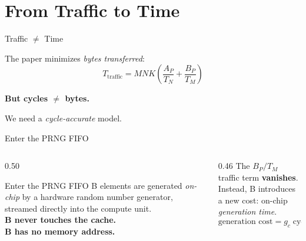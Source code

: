 \documentclass[aspectratio=169]{beamer}
\begin{document}
\section{From Traffic to Time}

\begin{frame}{Traffic $\neq$ Time}


\begin{center}
  The paper minimizes \emph{bytes transferred}:\\
  \medskip
  \[
    T_{\text{traffic}} = MNK\!\left(\frac{A_P}{T_N} + \frac{B_P}{T_M}\right)
  \]

  \bigskip
  \textbf{But cycles $\neq$ bytes.}

  \medskip
  We need a \emph{cycle-accurate} model.
\end{center}

\end{frame}


\begin{frame}{Enter the PRNG FIFO}

  \begin{columns}[c]

    \begin{column}{0.50\textwidth}
      \begin{block}{Enter the PRNG FIFO}
        B elements are generated \emph{on-chip} by a hardware random
        number generator, streamed directly into the compute unit.\\[6pt]
        \textbf{B never touches the cache.}\\
        \textbf{B has no memory address.}
      \end{block}
    \end{column}

    \begin{column}{0.46\textwidth}
      The $B_P / T_M$ traffic term \textbf{vanishes}.\\[8pt]
      Instead, B introduces a new cost: on-chip \emph{generation time}.
      \[
        \text{generation cost} = g_c \;\text{cycles / element}
      \]
    \end{column}

  \end{columns}

\end{frame}

\end{document}
